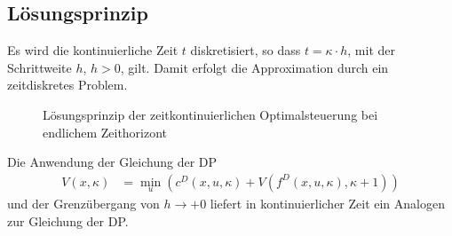 \subsection{Lösungsprinzip}
Es wird die kontinuierliche Zeit $t$ diskretisiert, so dass $t=\kappa\cdot h$, mit der Schrittweite $h$, $h>0$, gilt. Damit erfolgt die Approximation durch ein zeitdiskretes Problem. 
\begin{figure}[htb]
	\centering
	
	\caption{Lösungsprinzip der zeitkontinuierlichen Optimalsteuerung bei endlichem Zeithorizont}
	\label{fig:kap_3_loesungsprinzip}
\end{figure}
Die Anwendung der Gleichung der \ac{DP} 
\begin{align}
	V(x,\kappa) & = \min\limits_{u}\left(c^D(x, u, \kappa) + V\left(f^D(x, u ,\kappa),\kappa+1 \right) \right)
\end{align}
und der Grenzübergang von $h\rightarrow +0$ liefert in kontinuierlicher Zeit ein Analogen zur Gleichung der \ac{DP}.

